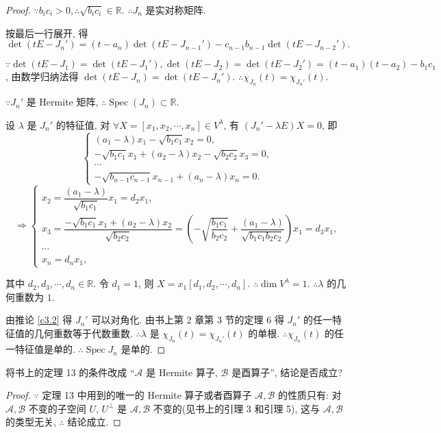 \documentclass[color=black,device=normal,lang=cn,mode=geye]{elegantnote}
\begin{document}
\begin{proof}
    $\because b_ic_i>0,\therefore\sqrt{b_ic_i}\in\mathbb{R}$. $\therefore J_n$ 是实对称矩阵.

    按最后一行展开, 得
    \[\det(tE-J_n')=(t-a_n)\det(tE-J_{n-1}')-c_{n-1}b_{n-1}\det(tE-J_{n-2}').\]

    $\because\det(tE-J_1)=\det(tE-J_1'),\det(tE-J_2)=\det(tE-J_2')=(t-a_1)(t-a_2)-b_1c_1$, 由数学归纳法得 $\det(tE-J_n)=\det(tE-J_n')$. $\therefore\chi_{J_n}(t)=\chi_{J_n'}(t)$.

    $\because J_n'$ 是 Hermite 矩阵, $\therefore\operatorname{Spec}(J_n)\subset\mathbb{R}$.
    
    设 $\lambda$ 是 $J_n'$ 的特征值, 对 $\forall X=[x_1,x_2,\cdots,x_n]\in V^\lambda$, 有 $(J_n'-\lambda E)X=0$, 即
    \[\begin{cases}
        (a_1-\lambda)x_1-\sqrt{b_1c_1}x_2=0, \\
        -\sqrt{b_1c_1}x_1+(a_2-\lambda)x_2-\sqrt{b_2c_2}x_3=0, \\
        \cdots \\
        -\sqrt{b_{n-1}c_{n-1}}x_{n-1}+(a_n-\lambda)x_n=0.
    \end{cases}\]
    \[\Rightarrow\begin{cases}
        x_2=\dfrac{(a_1-\lambda)}{\sqrt{b_1c_1}}x_1=d_2x_1, \\[8pt]
        x_3=\dfrac{-\sqrt{b_1c_1}x_1+(a_2-\lambda)x_2}{\sqrt{b_2c_2}}=\left(-\sqrt{\dfrac{b_1c_1}{b_2c_2}}+\dfrac{(a_1-\lambda)}{\sqrt{b_1c_1b_2c_2}}\right)x_1=d_3x_1, \\
        \cdots \\
        x_n=d_nx_1,
    \end{cases}\]

    其中 $d_2,d_3,\cdots,d_n\in\mathbb{R}$. 令 $d_1=1$, 则 $X=x_1[d_1,d_2,\cdots,d_n]$. $\therefore\dim V^\lambda=1$. $\therefore\lambda$ 的几何重数为 $1$.

    由推论 \ref{c3.2} 得 $J_n'$ 可以对角化. 由书上第 2 章第 3 节的定理 6 得 $J_n'$ 的任一特征值的几何重数等于代数重数. $\therefore\lambda$ 是 $\chi_{J_n}(t)=\chi_{J_n'}(t)$ 的单根. $\therefore\chi_{J_n}(t)$ 的任一特征值是单的. $\therefore\operatorname{Spec}J_n$ 是单的.
\end{proof}
\begin{exercise}%
    将书上的定理 13 的条件改成 ``$\mathcal{A}$ 是 Hermite 算子, $\mathcal{B}$ 是酉算子'', 结论是否成立?
\end{exercise}
\begin{proof}
    $\because$ 定理 13 中用到的唯一的 Hermite 算子或者酉算子 $\mathcal{A},\mathcal{B}$ 的性质只有: 对 $\mathcal{A},\mathcal{B}$ 不变的子空间 $U$, $U^\perp$ 是 $\mathcal{A},\mathcal{B}$ 不变的(见书上的引理 3 和引理 5), 这与 $\mathcal{A},\mathcal{B}$ 的类型无关, $\therefore$ 结论成立.
\end{proof}
\end{document}
